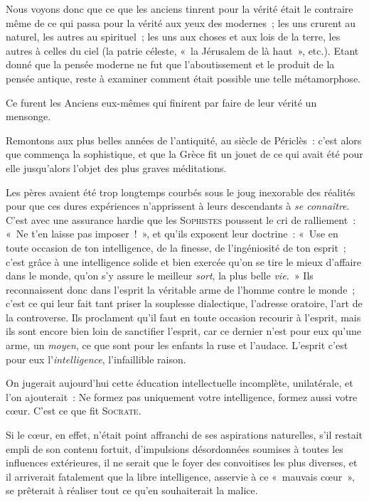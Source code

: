 \documentclass[french,twoside]{book} %
\begin{document}
Nous voyons donc que ce que les anciens tinrent pour la vérité était le contraire même de ce qui passa pour la vérité aux yeux des modernes ; les uns crurent au naturel, les autres au spirituel ; les uns aux choses et aux lois de la terre, les autres à celles du ciel (la patrie céleste, « la Jérusalem de là haut », etc.). Etant donné que la pensée moderne ne fut que l’aboutissement et le produit de la pensée antique, reste à examiner comment était possible une telle métamorphose.\par
Ce furent les Anciens eux-mêmes qui finirent par faire de leur vérité un mensonge.\par
Remontons aux plus belles années de l’antiquité, au siècle de Périclès : c’est alors que commença la sophistique, et que la Grèce fit un jouet de ce qui avait été pour elle jusqu’alors l’objet des plus graves méditations.\par
Les pères avaient été trop longtemps courbés sous le joug inexorable des réalités pour que ces dures expériences n’apprissent à leurs descendants à \emph{se connaître}. C’est avec une assurance hardie que les S{\scshape ophistes} poussent le cri de ralliement : « Ne t’en laisse pas imposer ! », et qu’ils exposent leur doctrine : « Use en toute occasion de ton intelligence, de la finesse, de l’ingéniosité de ton esprit ; c’est grâce à  une intelligence solide et bien exercée qu’on se tire le mieux d’affaire dans le monde, qu’on s’y assure le meilleur \emph{sort}, la plus belle \emph{vie.} » Ils reconnaissent donc dans l’esprit la véritable arme de l’homme contre le monde ; c’est ce qui leur fait tant priser la souplesse dialectique, l’adresse oratoire, l’art de la controverse. Ils proclament qu’il faut en toute occasion recourir à l’esprit, mais ils sont encore bien loin de sanctifier l’esprit, car ce dernier n’est pour eux qu’une arme, un \emph{moyen}, ce que sont pour les enfants la ruse et l’audace. L’esprit c’est pour eux l’\emph{intelligence}, l’infaillible raison.\par
On jugerait aujourd’hui cette éducation intellectuelle incomplète, unilatérale, et l’on ajouterait : Ne formez pas uniquement votre intelligence, formez aussi votre cœur. C’est ce que fit S{\scshape ocrate}.\par
Si le cœur, en effet, n’était point affranchi de ses aspirations naturelles, s’il restait empli de son contenu fortuit, d’impulsions désordonnées soumises à toutes les influences extérieures, il ne serait que le foyer des convoitises les plus diverses, et il arriverait fatalement que la libre intelligence, asservie à ce « mauvais cœur », se prêterait à réaliser tout ce qu’en souhaiterait la malice.\par
\end{document}
